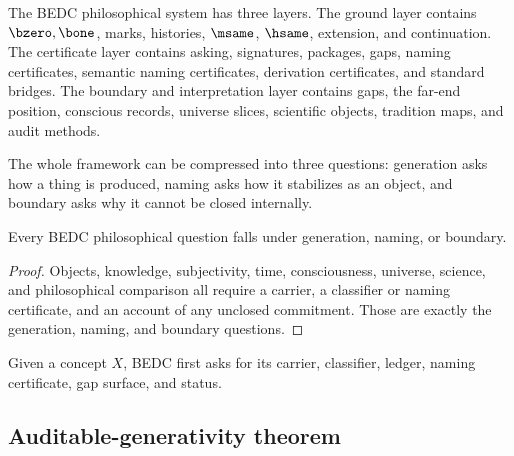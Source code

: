\begin{definition}
\label{def:philosophy-three-layer-system-total}
The BEDC philosophical system has three layers. The ground layer
contains \(\bzero,\bone\), marks, histories, \(\msame\), \(\hsame\),
extension, and continuation. The certificate layer contains asking,
signatures, packages, gaps, naming certificates, semantic naming
certificates, derivation certificates, and standard bridges. The
boundary and interpretation layer contains gaps, the far-end position,
conscious records, universe slices, scientific objects, tradition
maps, and audit methods.
\end{definition}

\begin{definition}
\label{def:philosophy-generation-naming-boundary-total}
The whole framework can be compressed into three questions: generation
asks how a thing is produced, naming asks how it stabilizes as an
object, and boundary asks why it cannot be closed internally.
\end{definition}

\begin{theorem}
\label{thm:philosophy-three-question-synthesis}
Every BEDC philosophical question falls under generation, naming, or
boundary.
\end{theorem}
\begin{proof}
Objects, knowledge, subjectivity, time, consciousness, universe,
science, and philosophical comparison all require a carrier, a
classifier or naming certificate, and an account of any unclosed
commitment. Those are exactly the generation, naming, and boundary
questions.
\end{proof}

\begin{corollary}
\label{cor:philosophy-bedc-question-form-total}
Given a concept \(X\), BEDC first asks for its carrier, classifier,
ledger, naming certificate, gap surface, and status.
\end{corollary}

\subsection{Auditable-generativity theorem}
\label{subsec:philosophy-auditable-generativity-theorem}


